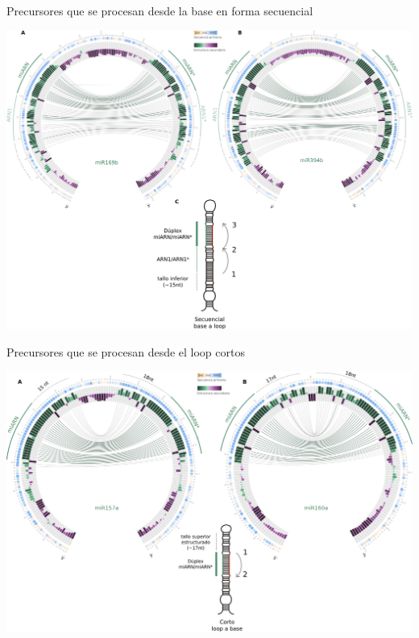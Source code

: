 \documentclass{beamer}
\begin{document}
\begin{frame}{Precursores que se procesan desde la base en forma secuencial}
	\begin{center}
		\includegraphics[width=1\textwidth]{img/seqBTL_circos_defensa.png}
	\end{center}
\end{frame}

\begin{frame}{Precursores que se procesan desde el loop cortos}
	\begin{center}
		\includegraphics[width=1\textwidth]{img/srLTB_circos_defensa.png}
	\end{center}
\end{frame}
\end{document}
